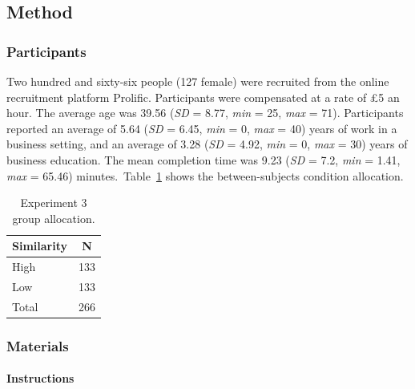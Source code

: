 \documentclass[a4paper, nobind, dvipsnames]{templates/ociamthesis}
\theoremstyle{definition}
\theoremstyle{definition}
\theoremstyle{definition}
\theoremstyle{definition}
\theoremstyle{remark}
\begin{document}
\subsection{Method}

\subsubsection{Participants}

Two hundred and sixty-six people (127 female) were recruited from the online recruitment platform Prolific. Participants were compensated at a rate of £5 an hour. The average age was 39.56 (\emph{SD} = 8.77, \emph{min} = 25, \emph{max} = 71). Participants reported an average of 5.64 (\emph{SD} = 6.45, \emph{min} = 0, \emph{max} = 40) years of work in a business setting, and an average of 3.28 (\emph{SD} = 4.92, \emph{min} = 0, \emph{max} = 30) years of business education. The mean completion time was 9.23 (\emph{SD} = 7.2, \emph{min} = 1.41, \emph{max} = 65.46) minutes.~Table~\ref{tab:condition-allocation-aggregation-3}
shows the between-subjects condition allocation.

\begin{table}[tbp]

\begin{center}
\begin{threeparttable}

\caption{\label{tab:condition-allocation-aggregation-3}Experiment 3 group allocation.}

\begin{tabular}{ll}
\toprule
Similarity & \multicolumn{1}{c}{N}\\
\midrule
High & 133\\
Low & 133\\
Total & 266\\
\bottomrule
\end{tabular}

\end{threeparttable}
\end{center}

\end{table}

\subsubsection{Materials}

\paragraph{Instructions}
\end{document}
